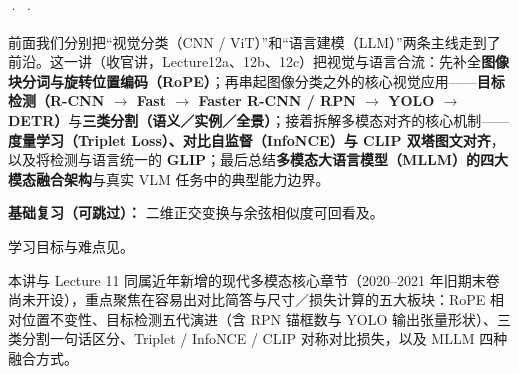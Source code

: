 



 ·  · 

前面我们分别把“视觉分类（CNN / ViT）”和“语言建模（LLM）”两条主线走到了前沿。这一讲（收官讲，Lecture12a、12b、12c）把视觉与语言合流：先补全\textbf{图像块分词与旋转位置编码（RoPE）}；再串起图像分类之外的核心视觉应用——\textbf{目标检测（R-CNN \ensuremath{\to} Fast \ensuremath{\to} Faster R-CNN / RPN \ensuremath{\to} YOLO \ensuremath{\to} DETR）}与\textbf{三类分割（语义／实例／全景）}；接着拆解多模态对齐的核心机制——\textbf{度量学习（Triplet Loss）、对比自监督（InfoNCE）与 CLIP 双塔图文对齐}，以及将检测与语言统一的 \textbf{GLIP}；最后总结\textbf{多模态大语言模型（MLLM）的四大模态融合架构}与真实 VLM 任务中的典型能力边界。

\textbf{基础复习（可跳过）：} 二维正交变换与余弦相似度可回看及。

学习目标与难点见。



本讲与 Lecture 11 同属近年新增的现代多模态核心章节（2020–2021 年旧期末卷尚未开设），重点聚焦在容易出对比简答与尺寸／损失计算的五大板块：RoPE 相对位置不变性、目标检测五代演进（含 RPN 锚框数与 YOLO 输出张量形状）、三类分割一句话区分、Triplet / InfoNCE / CLIP 对称对比损失，以及 MLLM 四种融合方式。

